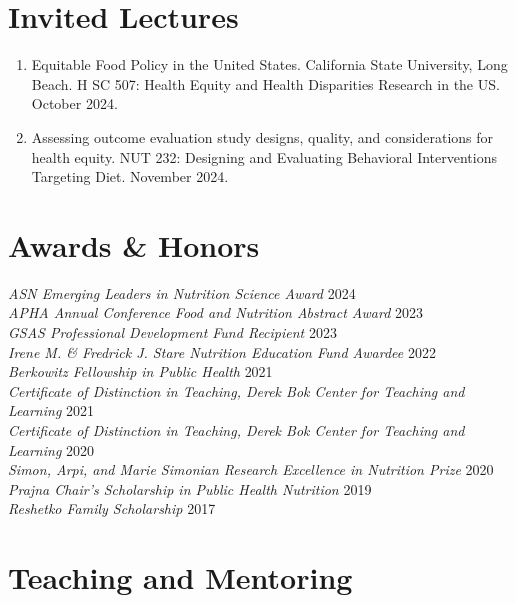 \documentclass{cv_style}
\begin{document}
\section{Invited Lectures}
\begin{enumerate}[leftmargin = 2em]
    \item Equitable Food Policy in the United States. California State University, Long Beach. H SC 507: Health Equity and Health Disparities Research in the US. October 2024.
    \item \parskip 1pt Assessing outcome evaluation study designs, quality, and considerations for health equity. NUT 232: Designing and Evaluating Behavioral Interventions Targeting Diet. November 2024.
\end{enumerate}



\section{Awards \& Honors}

\textit{ASN Emerging Leaders in Nutrition Science Award} \hfill {2024}\\
\textit{APHA Annual Conference Food and Nutrition Abstract Award} \hfill {2023}\\
\textit{GSAS Professional Development Fund Recipient} \hfill {2023}\\
\textit{Irene M. \& Fredrick J. Stare Nutrition Education Fund Awardee} \hfill {2022}\\
\textit{Berkowitz Fellowship in Public Health} \hfill {2021}\\
\textit{Certificate of Distinction in Teaching, Derek Bok Center for Teaching and Learning} \hfill {2021}\\
\textit{Certificate of Distinction in Teaching, Derek Bok Center for Teaching and Learning} \hfill {2020}\\
\textit{Simon, Arpi, and Marie Simonian Research Excellence in Nutrition Prize} \hfill {2020} \\
\textit{Prajna Chair's Scholarship in Public Health Nutrition} \hfill 2019 \\
\textit{Reshetko Family Scholarship} \hfill 2017




\parskip -5pt 
\section{Teaching and Mentoring}
\end{document}
